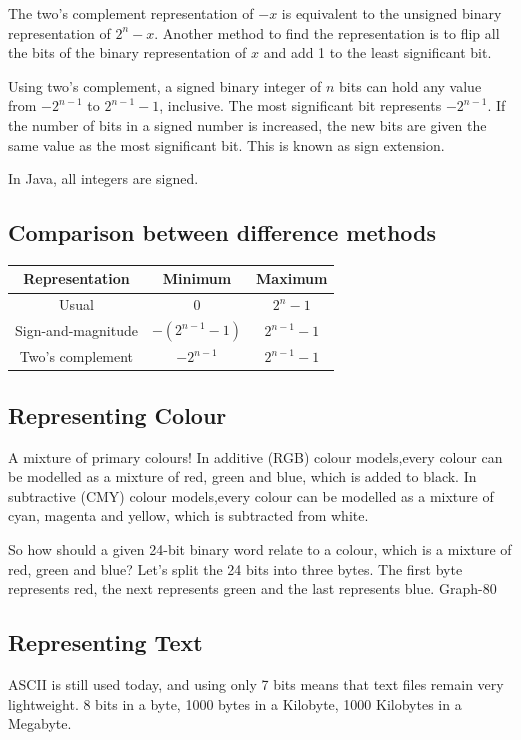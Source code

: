 The two's complement representation of \( -x \) is equivalent to the unsigned binary representation of \( 2^n - x \).
Another method to find the representation is to flip all the bits of the binary representation of \( x \) and add \num{1} to the least significant bit.

Using two's complement, a signed binary integer of \( n \) bits can hold any value from \( - 2^{n-1} \) to \( 2^{n-1} - 1 \), inclusive.
The most significant bit represents \( - 2^{n-1} \).
If the number of bits in a signed number is increased, the new bits are given the same value as the most significant bit.
This is known as sign extension.

In Java, all integers are signed.

\subsection{Comparison between difference methods}

\begin{center}
\begin{tabular}{|c|c|c|}
\hline
\textbf{Representation} & \textbf{Minimum} & \textbf{Maximum} \\
\hline
Usual & $0$ & $2^n - 1$ \\
\hline
Sign-and-magnitude & $-(2^{n-1} - 1)$ & $2^{n-1} - 1$ \\
\hline
Two’s complement & $-2^{n-1}$ & $2^{n-1} - 1$ \\
\hline
\end{tabular}
\end{center}

\subsection{Representing Colour}

A mixture of primary colours!
In additive (RGB) colour models,every colour can be modelled as a mixture of red, green and blue, which is added to black.
In subtractive (CMY) colour models,every colour can be modelled as a mixture of cyan, magenta and yellow, which is subtracted from white.

So how should a given 24-bit binary word relate to a colour, which is a mixture of red, green
and blue?
Let’s split the 24 bits into three bytes.
The first byte represents red,
the next represents green and
the last represents blue.
Graph-80
\subsection{Representing Text}
ASCII is still used today, and
using only 7 bits means that
text files remain very
lightweight.
8 bits in a byte,
1000 bytes in a Kilobyte,
1000 Kilobytes in a Megabyte.

